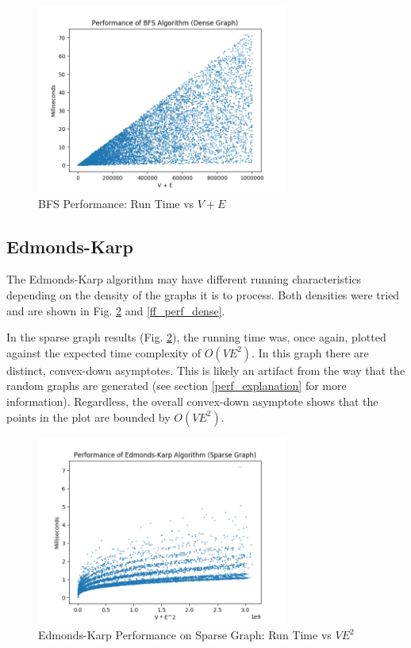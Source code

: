 \documentclass[conference]{IEEEtran}
\begin{document}
\begin{figure}
	\centering
	\includegraphics[width=3.25in]{BFS_DenseGraph.png}
	\caption{BFS Performance: Run Time vs $V + E$}
	\label{bfs_perf}
\end{figure}

\subsection{Edmonds-Karp}

The Edmonds-Karp algorithm may have different running characteristics depending on the 
density of the graphs it is to process. Both densities were tried and are shown in Fig. 
\ref{ff_perf_sparse} and \ref{ff_perf_dense}. 

In the sparse graph results (Fig. \ref{ff_perf_sparse}), the running time was, once again,
plotted against the expected time complexity of $O(VE^2)$. In this graph there are distinct,
convex-down asymptotes. This is likely an artifact from the way that the random graphs are 
generated (see section \ref{perf_explanation} for more information). Regardless, the overall convex-down asymptote shows that the points in the plot 
are bounded by $O(VE^2)$.

\begin{figure}
	\centering
	\includegraphics[width=3.25in]{Edmonds-Karp_Sparse.png}
	\caption{Edmonds-Karp Performance on Sparse Graph: Run Time vs $VE^2$}
	\label{ff_perf_sparse}
\end{figure}
\end{document}
